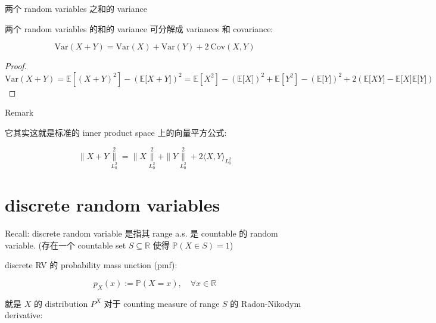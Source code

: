 \documentclass{qlnotes-export}
\begin{document}
\begin{proposition}{两个 random variables 之和的 variance}\label{prop-02-random-variables-random-variables-variance}

两个 random variables 的和的 variance 可分解成 variances 和 covariance:

\[\text{Var}(X + Y) = \text{Var}(X) + \text{Var}(Y) + 2\ \text{Cov}(X,Y)\]

\end{proposition}

\begin{proof}

\[\text{Var}(X + Y) = {\mathbb{E}}\left\lbrack {(X + Y)^{2}} \right\rbrack - ({\mathbb{E}}\lbrack X + Y\rbrack)^{2} = {\mathbb{E}}\left\lbrack X^{2} \right\rbrack - ({\mathbb{E}}\lbrack X\rbrack)^{2} + {\mathbb{E}}\left\lbrack Y^{2} \right\rbrack - ({\mathbb{E}}\lbrack Y\rbrack)^{2} + 2({\mathbb{E}}\lbrack XY\rbrack - {\mathbb{E}}\lbrack X\rbrack{\mathbb{E}}\lbrack Y\rbrack)\]

\end{proof}

\begin{qlremark}{Remark}

它其实这就是标准的 inner product space 上的向量平方公式:

\[\parallel X + Y\underset{L_{0}^{2}}{\overset{2}{\parallel}} = \parallel X\underset{L_{0}^{2}}{\overset{2}{\parallel}} + \parallel Y\underset{L_{0}^{2}}{\overset{2}{\parallel}} + 2\langle X,Y\rangle_{L_{0}^{2}}\]

\end{qlremark}

\section{discrete random variables}\label{discrete-random-variables}

Recall: discrete random variable 是指其 range a.s. 是 countable 的 random variable. (存在一个 countable set \(S \subseteq {\mathbb{R}}\) 使得 \({\mathbb{P}}(X \in S) = 1\))

discrete RV 的 probability mass unction (pmf):

\[p_{X}(x) := {\mathbb{P}}(X = x),\quad\forall x \in {\mathbb{R}}\]

就是 \(X\) 的 distribution \(P^{X}\) 对于 counting measure of range \(S\) 的 Radon-Nikodym derivative:
\end{document}
